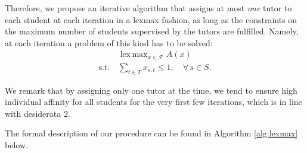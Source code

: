 \documentclass[11pt,oneside,a4paper]{article}     %
\DeclareMathOperator*{\lexmax}{lex\,max}
\begin{document}
Therefore, we propose an iterative algorithm that assigns at most \emph{one} tutor to each student at each iteration in a lexmax fashion, as long as the constraints on the maximum number of students supervised by the tutors are fulfilled. Namely, at each iteration a problem of this kind has to be solved:
\begin{align*}
& \, \lexmax_{x\in \mathcal F} A(x) \\
\mathrm{s.t.} & \, \sum_{t\in T} x_{s,t}\le 1, \quad \forall\, s\in S.
\end{align*}


We remark that by assigning only one tutor at the time, we tend to ensure high individual affinity for all students for the very first few iterations, which is in line with desiderata 2. 

\noindent The formal description of our procedure can be found in Algorithm \ref{alg:lexmax} below.
\end{document}
